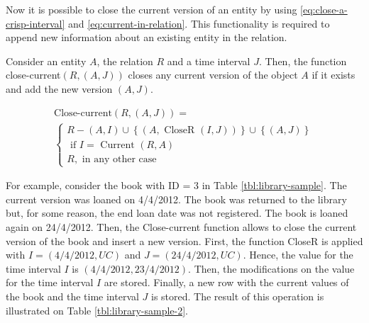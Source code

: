 Now it is possible to close the current version of an entity by using \eqref{eq:close-a-crisp-interval} and \eqref{eq:current-in-relation}. This functionality is required to append new information about an existing entity in the relation.

\begin{definition}
\label{def:close-current-version}
Consider an entity $A$, the relation $R$ and a time interval $J$. Then, the function close-current$\left(R,\left(A,J\right) \right)$ closes any current version of the object $A$ if it exists and add the new version $\left(A, J \right)$.

\begin{eqnarray}
\label{eq:close-current}
\text{Close-current} \left(R, \left(A, J\right) \right) =\\
\begin{cases}
\nonumber
R - \left(A, I \right) \cup \left \lbrace \left(A, \mbox{ CloseR } \left(I, J\right) \right)\right \rbrace \cup \left \lbrace\left(A, J\right) \right \rbrace  \\
\nonumber
\mbox{ if } I = \mbox{ Current } \left(R, A \right)\\ %
\nonumber R , \text{ in any other case}
\end{cases}
\end{eqnarray}
\end{definition}

For example, consider the book with ID = 3 in Table \ref{tbl:library-sample}. The current version was loaned on 4/4/2012. The book was returned to the library but, for some reason, the end loan date was not registered. The book is loaned again on 24/4/2012. Then, the Close-current function allows to close the current version of the book and insert a new version. First, the function CloseR is applied with $I = \left(4/4/2012, UC \right)$ and $J = \left(24/4/2012, UC \right)$. Hence, the value for the time interval $I$ is $ \left(4/4/2012, 23/4/2012 \right)$. Then, the modifications on the value for the time interval $I$ are stored. Finally, a new row with the current values of the book and the time interval $J$ is stored.
The result of this operation is illustrated on Table \ref{tbl:library-sample-2}.




